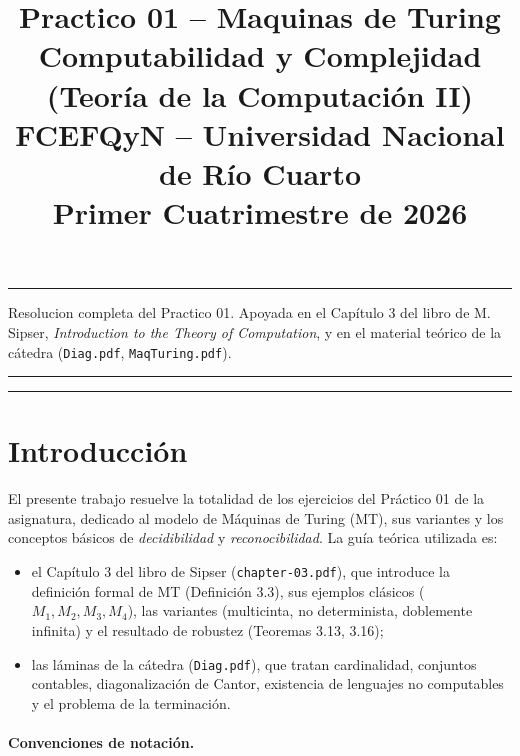 \documentclass[11pt,a4paper]{article}
\title{\textbf{Practico 01 -- Maquinas de Turing}\\[0.3em]
       \normalsize Computabilidad y Complejidad (Teor\'ia de la Computaci\'on II)\\
       \normalsize FCEFQyN -- Universidad Nacional de R\'io Cuarto\\
       \normalsize Primer Cuatrimestre de 2026}
\author{}
\date{}
\theoremstyle{plain}
\theoremstyle{definition}
\theoremstyle{remark}
\begin{document}
\maketitle
\thispagestyle{empty}

\hrule
\vspace{0.4em}
\begin{center}
\small
Resolucion completa del Practico 01. Apoyada en el Cap\'itulo 3 del libro de
M. Sipser, \emph{Introduction to the Theory of Computation}, y en el material
te\'orico de la c\'atedra (\texttt{Diag.pdf}, \texttt{MaqTuring.pdf}).
\end{center}
\vspace{0.4em}
\hrule

\tableofcontents
\bigskip
\hrule
\bigskip

\section*{Introducci\'on}

El presente trabajo resuelve la totalidad de los ejercicios del Pr\'actico 01
de la asignatura, dedicado al modelo de M\'aquinas de Turing (MT), sus
variantes y los conceptos b\'asicos de \emph{decidibilidad} y
\emph{reconocibilidad}. La gu\'ia te\'orica utilizada es:

\begin{itemize}
  \item el Cap\'itulo 3 del libro de Sipser (\texttt{chapter-03.pdf}), que
        introduce la definici\'on formal de MT (Definici\'on 3.3), sus
        ejemplos cl\'asicos ($M_1, M_2, M_3, M_4$), las variantes (multicinta,
        no determinista, doblemente infinita) y el resultado de robustez
        (Teoremas 3.13, 3.16);
  \item las l\'aminas de la c\'atedra (\texttt{Diag.pdf}), que tratan
        cardinalidad, conjuntos contables, diagonalizaci\'on de Cantor,
        existencia de lenguajes no computables y el problema de la
        terminaci\'on.
\end{itemize}

\paragraph{Convenciones de notaci\'on.}
\end{document}
